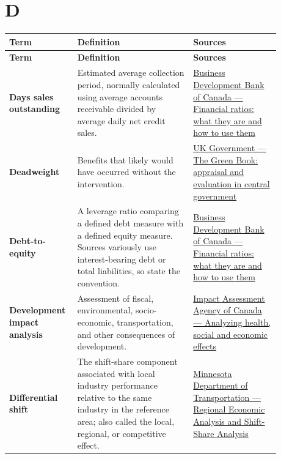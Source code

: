 \documentclass[11pt,letterpaper,oneside,openany]{book}
\begin{document}
\section[D]{D}
\begin{center}
\small
\setlength{\LTpre}{0.4em}
\setlength{\LTpost}{0.8em}
\begin{longtable}{>{\RaggedRight\arraybackslash}p{0.180\linewidth}>{\RaggedRight\arraybackslash}p{0.400\linewidth}>{\RaggedRight\arraybackslash}p{0.300\linewidth}}
\rowcolor{DeepNavy}
\color{white}\bfseries Term & \color{white}\bfseries Definition & \color{white}\bfseries Sources \\
\endfirsthead
\rowcolor{DeepNavy}
\color{white}\bfseries Term & \color{white}\bfseries Definition & \color{white}\bfseries Sources \\
\endhead
\textbf{Days sales outstanding} & Estimated average collection period, normally calculated using average accounts receivable divided by average daily net credit sales. & \href{https://www.bdc.ca/en/articles-tools/money-finance/manage-finances/financial-ratios-what-are-how-use}{Business Development Bank of Canada --- Financial ratios: what they are and how to use them} \\
\textbf{Deadweight} & Benefits that likely would have occurred without the intervention. & \href{https://www.gov.uk/government/publications/the-green-book-appraisal-and-evaluation-in-central-government/the-green-book-2026}{UK Government --- The Green Book: appraisal and evaluation in central government} \\
\textbf{Debt-to-equity} & A leverage ratio comparing a defined debt measure with a defined equity measure. Sources variously use interest-bearing debt or total liabilities, so state the convention. & \href{https://www.bdc.ca/en/articles-tools/money-finance/manage-finances/financial-ratios-what-are-how-use}{Business Development Bank of Canada --- Financial ratios: what they are and how to use them} \\
\textbf{Development impact analysis} & Assessment of fiscal, environmental, socio-economic, transportation, and other consequences of development. & \href{https://www.canada.ca/en/impact-assessment-agency/services/policy-guidance/practitioners-guide-impact-assessment-act/analyzing-health-social-economic-effects-impact-assessment-act.html}{Impact Assessment Agency of Canada --- Analyzing health, social and economic effects} \\
\textbf{Differential shift} & The shift-share component associated with local industry performance relative to the same industry in the reference area; also called the local, regional, or competitive effect. & \href{https://www.dot.mn.gov/ofrw/freight/PDF/d1plan/wp2.pdf}{Minnesota Department of Transportation --- Regional Economic Analysis and Shift-Share Analysis} \\

\end{longtable}
\end{center}
\end{document}
